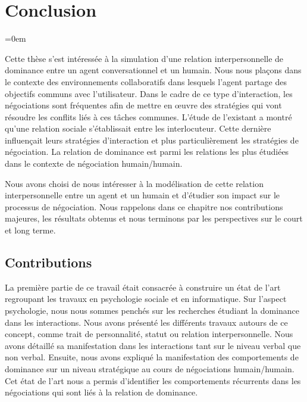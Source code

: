 \chapter{Conclusion}

\begingroup
\parindent=0em

\localtableofcontents 
\clearpage
\endgroup

Cette thèse s'est intéressée à la simulation d'une relation interpersonnelle de dominance entre un agent conversationnel et un humain.
Nous nous plaçons dans le contexte des environnements collaboratifs dans lesquels l'agent partage des objectifs communs avec l'utilisateur. Dans le cadre de ce type d'interaction, les négociations sont fréquentes afin de mettre en œuvre des stratégies qui vont résoudre les conflits liés à ces tâches communes. 
L'étude de l'existant a montré qu'une relation sociale s'établissait entre les interlocuteur. Cette dernière influençait leurs stratégies d'interaction et plus particulièrement les stratégies de négociation. La relation de dominance est parmi les relations les plus étudiées dans le contexte de négociation humain/humain. 

Nous avons choisi de nous intéresser à la modélisation de cette relation interpersonnelle entre un agent et un humain et d'étudier son impact sur le processus de négociation.  Nous rappelons dans ce chapitre nos contributions majeures, les résultats obtenus et nous terminons par les perspectives sur le court et long terme. 

 
\section{Contributions}
	La première partie de ce travail était consacrée à construire un état de l'art regroupant les travaux en psychologie sociale et en informatique.  Sur l'aspect psychologie, nous nous sommes penchés sur les recherches étudiant la dominance dans les interactions. Nous avons présenté les différents travaux autours de ce concept, comme trait de personnalité, statut ou relation interpersonnelle.
	Nous avons détaillé sa manifestation dans les interactions tant sur le niveau verbal que non verbal. Ensuite, nous avons expliqué la manifestation des comportements de dominance sur un niveau stratégique au cours de négociations humain/humain.
	Cet état de l'art nous a permis d'identifier les comportements récurrents dans les négociations qui sont liés à la relation de dominance.
	
